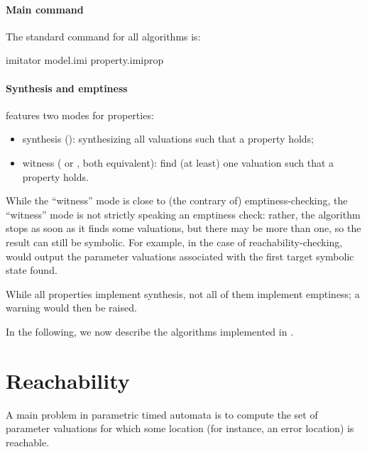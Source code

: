 \paragraph{Main command}
The standard \imitator{} command for all algorithms is:

\begin{terminal}
imitator model.imi property.imiprop
\end{terminal}

\paragraph{Synthesis and emptiness}
\imitator{} features two modes for properties:

\begin{itemize}
	\item synthesis (): synthesizing all valuations such that a property holds;
	\item witness ( or , both equivalent): find (at least) one valuation such that a property holds.
\end{itemize}

While the ``witness'' mode is close to (the contrary of) emptiness-checking, the ``witness'' mode is not strictly speaking an emptiness check: rather, the algorithm stops as soon as it finds some valuations, but there may be more than one, so the result can still be symbolic.
For example, in the case of reachability-checking, \imitator{} would output the parameter valuations associated with the first target symbolic state found.


While all properties implement synthesis, not all of them implement emptiness; a warning would then be raised.

In the following, we now describe the algorithms implemented in \imitator{}.

\section{Reachability}\label{ss:mode:EFsynth}

A main problem in parametric timed automata is to compute the set of parameter valuations for which some location (for instance, an error location) is reachable.

